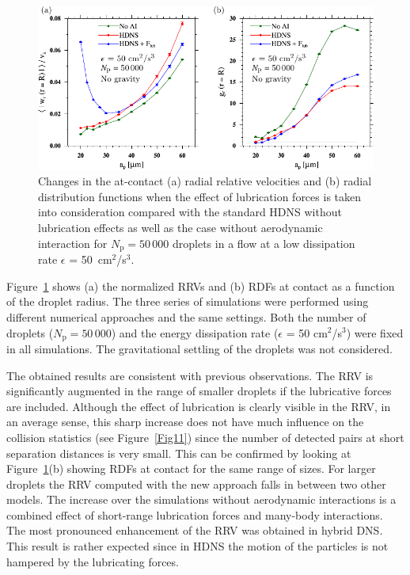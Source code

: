 \documentclass[../thesis.tex]{subfiles}
\begin{document}
\begin{figure}%
\center
\includegraphics[width=\textwidth]{../figs/JFM/fig12.pdf}
\caption{Changes in the at-contact (a) radial relative velocities and (b) radial distribution functions when the effect of lubrication forces is taken into consideration compared with the standard HDNS without lubrication effects as well as the case without aerodynamic interaction for $N_\mathrm{p} = 50\,000$ droplets in a flow at a low dissipation rate $\epsilon$ = 50~cm$^2$/s$^3$.}
\label{Fig12}
\end{figure}%

Figure~\ref{Fig12} shows (a) the normalized RRVs and (b) RDFs at contact as a function of the droplet radius. The three series of simulations were performed using different numerical approaches and the same settings. Both the number of droplets ($N_\mathrm{p} = 50\,000$) and the energy dissipation rate ($\epsilon$ = 50 cm$^2$/s$^3$) were fixed in all simulations. The gravitational settling of the droplets was not considered.

The obtained results are consistent with previous observations. The RRV is significantly augmented in the range of smaller droplets if the lubricative forces are included. Although the effect of lubrication is clearly visible in the RRV, in an average sense, this sharp increase does not have much influence on the collision statistics (see Figure~\ref{Fig11}) since the number of detected pairs at short separation distances is very small. This can be confirmed by looking at Figure~\ref{Fig12}(b) showing  RDFs at contact for the same range of sizes. For larger droplets the RRV computed with the new approach falls in between two other models. The increase over the simulations without aerodynamic interactions is a combined effect of short-range lubrication forces and many-body interactions. The most pronounced enhancement of the RRV was obtained in hybrid DNS. This result is rather expected since in HDNS the motion of the particles is not hampered by the lubricating forces.
\end{document}
